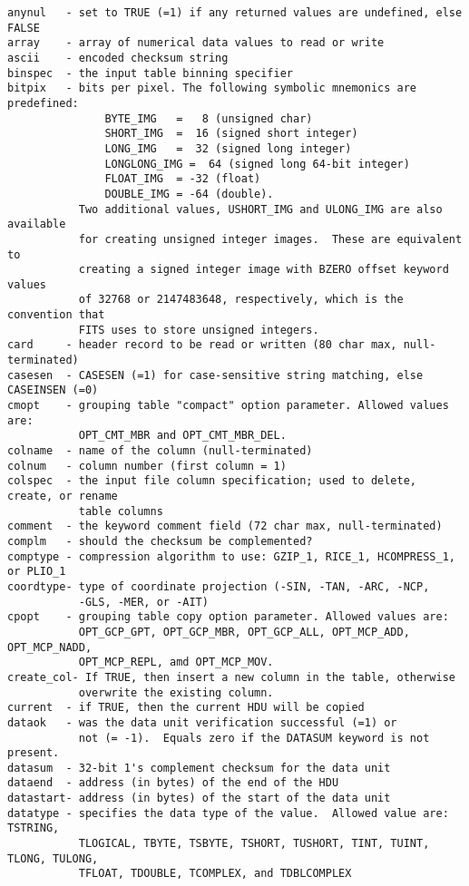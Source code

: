 \documentclass[11pt]{book}
\begin{document}
\begin{verbatim}
anynul   - set to TRUE (=1) if any returned values are undefined, else FALSE
array    - array of numerical data values to read or write
ascii    - encoded checksum string
binspec  - the input table binning specifier
bitpix   - bits per pixel. The following symbolic mnemonics are predefined:
               BYTE_IMG   =   8 (unsigned char)
               SHORT_IMG  =  16 (signed short integer)
               LONG_IMG   =  32 (signed long integer)
               LONGLONG_IMG =  64 (signed long 64-bit integer)
               FLOAT_IMG  = -32 (float)
               DOUBLE_IMG = -64 (double).
           Two additional values, USHORT_IMG and ULONG_IMG are also available
           for creating unsigned integer images.  These are equivalent to
           creating a signed integer image with BZERO offset keyword values
           of 32768 or 2147483648, respectively, which is the convention that
           FITS uses to store unsigned integers.
card     - header record to be read or written (80 char max, null-terminated)
casesen  - CASESEN (=1) for case-sensitive string matching, else CASEINSEN (=0)
cmopt    - grouping table "compact" option parameter. Allowed values are:
           OPT_CMT_MBR and OPT_CMT_MBR_DEL.
colname  - name of the column (null-terminated)
colnum   - column number (first column = 1)
colspec  - the input file column specification; used to delete, create, or rename
           table columns
comment  - the keyword comment field (72 char max, null-terminated)
complm   - should the checksum be complemented?
comptype - compression algorithm to use: GZIP_1, RICE_1, HCOMPRESS_1, or PLIO_1
coordtype- type of coordinate projection (-SIN, -TAN, -ARC, -NCP,
           -GLS, -MER, or -AIT)
cpopt    - grouping table copy option parameter. Allowed values are:
           OPT_GCP_GPT, OPT_GCP_MBR, OPT_GCP_ALL, OPT_MCP_ADD, OPT_MCP_NADD,
           OPT_MCP_REPL, amd OPT_MCP_MOV.
create_col- If TRUE, then insert a new column in the table, otherwise
           overwrite the existing column.
current  - if TRUE, then the current HDU will be copied
dataok   - was the data unit verification successful (=1) or
           not (= -1).  Equals zero if the DATASUM keyword is not present.
datasum  - 32-bit 1's complement checksum for the data unit
dataend  - address (in bytes) of the end of the HDU
datastart- address (in bytes) of the start of the data unit
datatype - specifies the data type of the value.  Allowed value are:  TSTRING,
           TLOGICAL, TBYTE, TSBYTE, TSHORT, TUSHORT, TINT, TUINT, TLONG, TULONG,
           TFLOAT, TDOUBLE, TCOMPLEX, and TDBLCOMPLEX

\end{verbatim}
\end{document}
